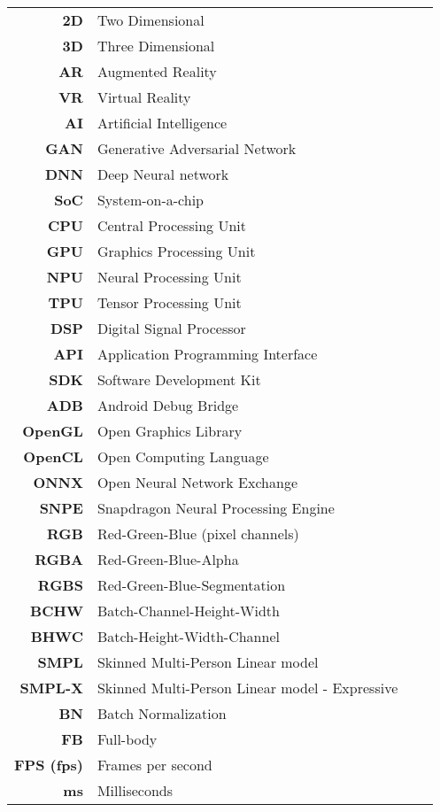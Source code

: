 \begin{center}
\begin{tabular}{>{\bf}r l >{\bf}r l}
	2D & Two Dimensional \\
	3D & Three Dimensional\\
	AR & Augmented Reality \\
	VR & Virtual Reality \\ 
	AI & Artificial Intelligence \\
	GAN & Generative Adversarial Network \\
	DNN & Deep Neural network \\
	SoC & System-on-a-chip \\
	CPU & Central Processing Unit \\
	GPU & Graphics Processing Unit \\
	NPU & Neural Processing Unit \\
	TPU & Tensor Processing Unit \\
	DSP & Digital Signal Processor \\
	API & Application Programming Interface \\
	SDK & Software Development Kit \\
	ADB & Android Debug Bridge \\
	OpenGL & Open Graphics Library \\
	OpenCL & Open Computing Language \\
	ONNX & Open Neural Network Exchange \\
	SNPE & Snapdragon Neural Processing Engine \\
	RGB & Red-Green-Blue (pixel channels) \\
	RGBA & Red-Green-Blue-Alpha \\
	RGBS & Red-Green-Blue-Segmentation \\
	BCHW & Batch-Channel-Height-Width \\
	BHWC & Batch-Height-Width-Channel \\
	SMPL & Skinned Multi-Person Linear model \cite{smpl} \\
	SMPL-X & Skinned Multi-Person Linear model - Expressive \cite{smplx}\\
	BN & Batch Normalization \\
	FB & Full-body \\
	FPS (fps) & Frames per second\\
	ms & Milliseconds \\
\end{tabular}
\end{center}